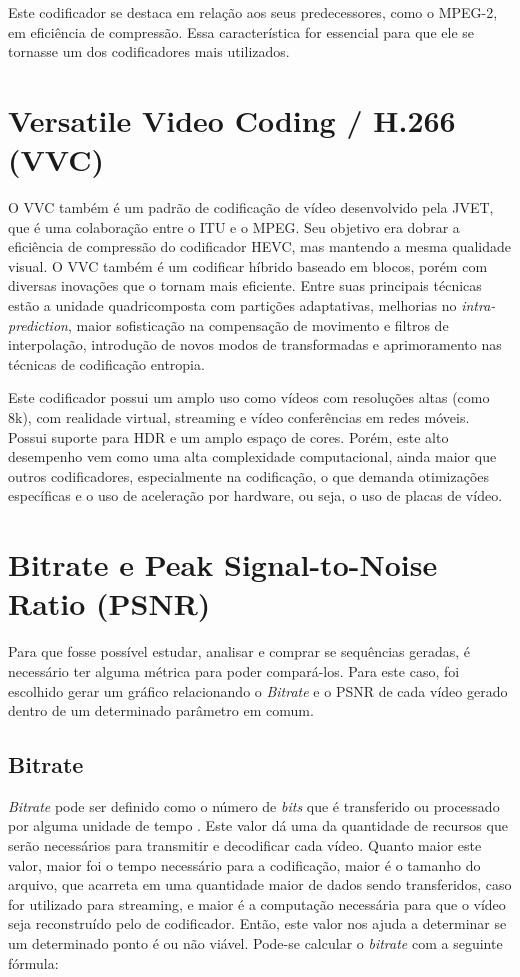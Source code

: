 Este codificador se destaca em relação aos seus predecessores, como o MPEG-2, em
eficiência de compressão. Essa característica for essencial para que ele se tornasse
um dos codificadores mais utilizados. \cite{h264_white_paper}

\section{Versatile Video Coding / H.266 (VVC)}

O \acrshort{VVC} também é um padrão de codificação de vídeo desenvolvido pela \acrfull{JVET},
que é uma colaboração entre o \acrfull{ITU} e o \acrfull{MPEG}. Seu objetivo era
dobrar a eficiência de compressão do codificador \acrshort{HEVC}, mas mantendo a 
mesma qualidade visual. O \acrshort{VVC} também é um codificar híbrido baseado
em blocos, porém com diversas inovações que o tornam mais eficiente. Entre suas 
principais técnicas estão a unidade quadricomposta com partições adaptativas, melhorias
no \textit{intra-prediction}, maior sofisticação na compensação de movimento e filtros de
interpolação, introdução de novos modos de transformadas e aprimoramento nas técnicas de
codificação entropia. 

Este codificador possui um amplo uso como vídeos com resoluções altas (como 8k), com realidade
virtual, streaming e vídeo conferências em redes móveis. Possui suporte para HDR e um amplo
espaço de cores. Porém, este alto desempenho vem como uma alta complexidade computacional,
ainda maior que outros codificadores, especialmente na codificação, o que demanda otimizações
específicas e o uso de aceleração por hardware, ou seja, o uso de placas de vídeo. \cite{vvc_paper}

\section{Bitrate e Peak Signal-to-Noise Ratio (PSNR)}

Para que fosse possível estudar, analisar e comprar se sequências geradas, é necessário
ter alguma métrica para poder compará-los. Para este caso, foi escolhido gerar um
gráfico relacionando o \textit{Bitrate} e o \acrshort{PSNR} de cada vídeo gerado
dentro de um determinado parâmetro em comum.

\subsection{Bitrate}

\textit{Bitrate} pode ser definido como o número de \textit{bits} que é transferido
ou processado por alguma unidade de tempo \cite{gupta2006data}. Este valor dá uma
da quantidade de recursos que serão necessários para transmitir e decodificar cada
vídeo. Quanto maior este valor, maior foi o tempo necessário para a codificação,
maior é o tamanho do arquivo, que acarreta em uma quantidade maior de dados sendo
transferidos, caso for utilizado para streaming, e maior é a computação necessária
para que o vídeo seja reconstruído pelo de codificador. Então, este valor nos ajuda
a determinar se um determinado ponto é ou não viável. Pode-se calcular o 
\textit{bitrate} com a seguinte fórmula:

